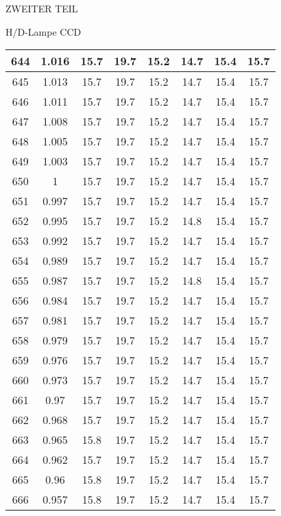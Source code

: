 \begin{appendix}
\begin{chapter}{ZWEITER TEIL}
\begin{section}{H/D-Lampe CCD}
\begin{scriptsize}
\begin{longtable}[htbp]{|c|c|c|c|c|c|c|c|}
            644 & 1.016 & 15.7 & 19.7 & 15.2 & 14.7 & 15.4 & 15.7 \\ \hline
            645 & 1.013 & 15.7 & 19.7 & 15.2 & 14.7 & 15.4 & 15.7 \\ \hline
            646 & 1.011 & 15.7 & 19.7 & 15.2 & 14.7 & 15.4 & 15.7 \\ \hline
            647 & 1.008 & 15.7 & 19.7 & 15.2 & 14.7 & 15.4 & 15.7 \\ \hline
            648 & 1.005 & 15.7 & 19.7 & 15.2 & 14.7 & 15.4 & 15.7 \\ \hline
            649 & 1.003 & 15.7 & 19.7 & 15.2 & 14.7 & 15.4 & 15.7 \\ \hline
            650 & 1 & 15.7 & 19.7 & 15.2 & 14.7 & 15.4 & 15.7 \\ \hline
            651 & 0.997 & 15.7 & 19.7 & 15.2 & 14.7 & 15.4 & 15.7 \\ \hline
            652 & 0.995 & 15.7 & 19.7 & 15.2 & 14.8 & 15.4 & 15.7 \\ \hline
            653 & 0.992 & 15.7 & 19.7 & 15.2 & 14.7 & 15.4 & 15.7 \\ \hline
            654 & 0.989 & 15.7 & 19.7 & 15.2 & 14.7 & 15.4 & 15.7 \\ \hline
            655 & 0.987 & 15.7 & 19.7 & 15.2 & 14.8 & 15.4 & 15.7 \\ \hline
            656 & 0.984 & 15.7 & 19.7 & 15.2 & 14.7 & 15.4 & 15.7 \\ \hline
            657 & 0.981 & 15.7 & 19.7 & 15.2 & 14.7 & 15.4 & 15.7 \\ \hline
            658 & 0.979 & 15.7 & 19.7 & 15.2 & 14.7 & 15.4 & 15.7 \\ \hline
            659 & 0.976 & 15.7 & 19.7 & 15.2 & 14.7 & 15.4 & 15.7 \\ \hline
            660 & 0.973 & 15.7 & 19.7 & 15.2 & 14.7 & 15.4 & 15.7 \\ \hline
            661 & 0.97 & 15.7 & 19.7 & 15.2 & 14.7 & 15.4 & 15.7 \\ \hline
            662 & 0.968 & 15.7 & 19.7 & 15.2 & 14.7 & 15.4 & 15.7 \\ \hline
            663 & 0.965 & 15.8 & 19.7 & 15.2 & 14.7 & 15.4 & 15.7 \\ \hline
            664 & 0.962 & 15.7 & 19.7 & 15.2 & 14.7 & 15.4 & 15.7 \\ \hline
            665 & 0.96 & 15.8 & 19.7 & 15.2 & 14.7 & 15.4 & 15.7 \\ \hline
            666 & 0.957 & 15.8 & 19.7 & 15.2 & 14.7 & 15.4 & 15.7 \\ \hline

\end{longtable}
\end{scriptsize}
\end{section}
\end{chapter}
\end{appendix}
